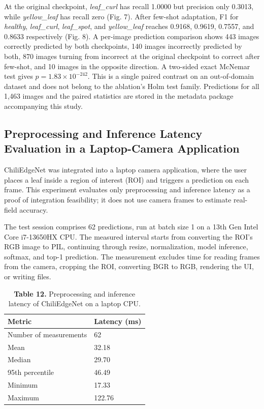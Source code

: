 At the original checkpoint, \emph{leaf\_curl} has recall 1.0000 but precision only 0.3013, while \emph{yellow\_leaf} has recall zero (Fig. 7). After few-shot adaptation, F1 for \emph{healthy}, \emph{leaf\_curl}, \emph{leaf\_spot}, and \emph{yellow\_leaf} reaches 0.9168, 0.9619, 0.7557, and 0.8633 respectively (Fig. 8). A per-image prediction comparison shows 443 images correctly predicted by both checkpoints, 140 images incorrectly predicted by both, 870 images turning from incorrect at the original checkpoint to correct after few-shot, and 10 images in the opposite direction. A two-sided exact McNemar test gives $p = 1.83 \times 10^{-242}$. This is a single paired contrast on an out-of-domain dataset and does not belong to the ablation's Holm test family. Predictions for all 1,463 images and the paired statistics are stored in the metadata package accompanying this study.

\subsection{Preprocessing and Inference Latency Evaluation in a Laptop-Camera Application}\label{preprocessing-and-inference-latency-evaluation-in-a-laptop-camera-application}

ChiliEdgeNet was integrated into a laptop camera application, where the user places a leaf inside a region of interest (ROI) and triggers a prediction on each frame. This experiment evaluates only preprocessing and inference latency as a proof of integration feasibility; it does not use camera frames to estimate real-field accuracy.

The test session comprises 62 predictions, run at batch size 1 on a 13th Gen Intel Core i7-13650HX CPU. The measured interval starts from converting the ROI's RGB image to PIL, continuing through resize, normalization, model inference, softmax, and top-1 prediction. The measurement excludes time for reading frames from the camera, cropping the ROI, converting BGR to RGB, rendering the UI, or writing files.

\begin{table}[H]
\centering
\caption*{\textbf{Table 12.} Preprocessing and inference latency of ChiliEdgeNet on a laptop CPU.}
\label{tab:12}
\small
\renewcommand{\arraystretch}{1.15}
\begin{tabular}{ll}
\toprule
\textbf{Metric} & \textbf{Latency (ms)} \\
\midrule
Number of measurements & 62 \\
Mean & 32.18 \\
Median & 29.70 \\
95th percentile & 46.49 \\
Minimum & 17.33 \\
Maximum & 122.76 \\
\bottomrule
\end{tabular}
\end{table}


